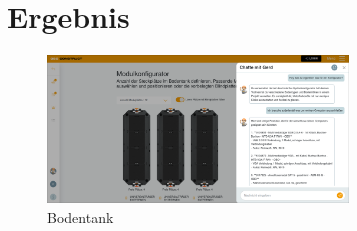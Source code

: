 \chapter{Ergebnis}\label{ch:ergebnis}
\begin{figure}[H]
    \begin{center}
        \includegraphics[width=8cm]{bilder/chatbot.png}
        \caption{Bodentank}\label{fig:bodentank}
    \end{center}
\end{figure}

